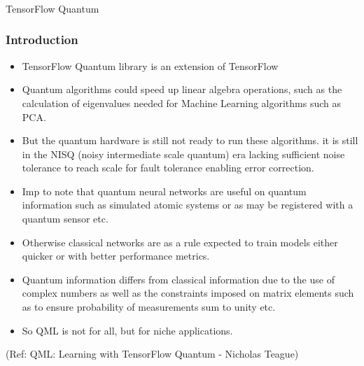 \begin{frame}[fragile]\frametitle{}
\begin{center}
{\Large TensorFlow Quantum}
\end{center}
\end{frame}

 \begin{frame}[fragile]\frametitle{Introduction}
 
\begin{itemize}
\item   TensorFlow Quantum library is an extension of TensorFlow 
\item  Quantum algorithms could speed up linear algebra operations, such as the calculation of eigenvalues needed for Machine Learning algorithms such as PCA.
\item But the quantum hardware is still not ready to run these algorithms. it is  still in the
NISQ (noisy intermediate scale quantum) era lacking sufficient noise tolerance to reach
scale for fault tolerance enabling error correction.
\item Imp to note that quantum neural networks are useful on quantum information such as simulated atomic systems or as may be registered with a quantum sensor etc.
\item  Otherwise classical networks are as a rule expected to train models either quicker or with better performance metrics.
\item Quantum
information differs from classical information due to the use of complex numbers as well
as the constraints imposed on matrix elements such as to ensure probability of
measurements sum to unity etc.
\item So QML is not for all, but for niche applications.
\end{itemize}

	
\tiny{(Ref: QML: Learning with TensorFlow Quantum - Nicholas Teague)}

\end{frame}

